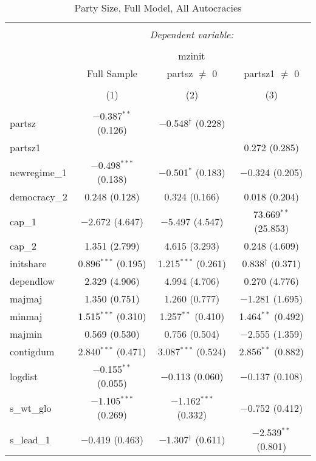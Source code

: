 
\begin{table}[!htbp] \centering 
  \caption{Party Size, Full Model, All Autocracies} 
  \label{} 
\begin{tabular}{@{\extracolsep{5pt}}lccc} 
\\[-1.8ex]\hline 
\hline \\[-1.8ex] 
 & \multicolumn{3}{c}{\textit{Dependent variable:}} \\ 
\cline{2-4} 
\\[-1.8ex] & \multicolumn{3}{c}{mzinit} \\ 
 & Full Sample & partsz $\neq$ 0 & partsz1 $\neq$ 0 \\ 
\\[-1.8ex] & (1) & (2) & (3)\\ 
\hline \\[-1.8ex] 
 partsz & $-$0.387$^{**}$ (0.126) & $-$0.548$^{\dagger}$ (0.228) &  \\ 
  partsz1 &  &  & 0.272 (0.285) \\ 
  newregime\_1 & $-$0.498$^{***}$ (0.138) & $-$0.501$^{*}$ (0.183) & $-$0.324 (0.205) \\ 
  democracy\_2 & 0.248 (0.128) & 0.324 (0.166) & 0.018 (0.204) \\ 
  cap\_1 & $-$2.672 (4.647) & $-$5.497 (4.547) & 73.669$^{**}$ (25.853) \\ 
  cap\_2 & 1.351 (2.799) & 4.615 (3.293) & 0.248 (4.609) \\ 
  initshare & 0.896$^{***}$ (0.195) & 1.215$^{***}$ (0.261) & 0.838$^{\dagger}$ (0.371) \\ 
  dependlow & 2.329 (4.906) & 4.994 (4.706) & 0.270 (4.776) \\ 
  majmaj & 1.350 (0.751) & 1.260 (0.777) & $-$1.281 (1.695) \\ 
  minmaj & 1.515$^{***}$ (0.310) & 1.257$^{**}$ (0.410) & 1.464$^{**}$ (0.492) \\ 
  majmin & 0.569 (0.530) & 0.756 (0.504) & $-$2.555 (1.359) \\ 
  contigdum & 2.840$^{***}$ (0.471) & 3.087$^{***}$ (0.524) & 2.856$^{**}$ (0.882) \\ 
  logdist & $-$0.155$^{**}$ (0.055) & $-$0.113 (0.060) & $-$0.137 (0.108) \\ 
  s\_wt\_glo & $-$1.105$^{***}$ (0.269) & $-$1.162$^{***}$ (0.332) & $-$0.752 (0.412) \\ 
  s\_lead\_1 & $-$0.419 (0.463) & $-$1.307$^{\dagger}$ (0.611) & $-$2.539$^{**}$ (0.801) \\ 

\end{tabular}
\end{table}
